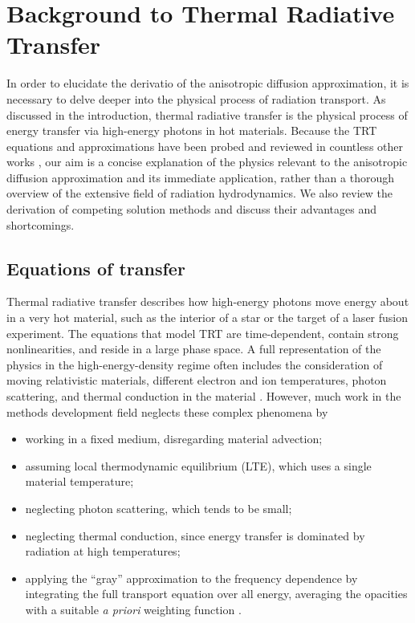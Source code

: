 
\chapter{Background to Thermal Radiative Transfer}\label{chap:trtBackground}

In order to elucidate the derivatio of the anisotropic
diffusion approximation, it is necessary to delve deeper into the physical
process of radiation transport. As discussed in the introduction,
thermal radiative transfer is the physical process of energy transfer via
high-energy photons in hot materials. Because the TRT equations and
approximations have been probed and reviewed in countless other works
\cite{Mih1984,Pom1973,Cas2004,Wol2008}, our aim is a concise explanation of the
physics relevant to the anisotropic diffusion approximation and its immediate
application, rather than a thorough overview of the extensive field of radiation
hydrodynamics. We also review the derivation of competing solution methods and
discuss their advantages and shortcomings.

\section{Equations of transfer}\label{sec:bgTrtEquations}
Thermal radiative transfer describes how high-energy photons move energy about
in a very hot material, such as the interior of a star or the target of a laser
fusion experiment. The equations that model TRT are time-dependent, contain
strong nonlinearities, and reside in a large phase space.
A full representation of the physics in
the high-energy-density regime often includes the consideration of moving
relativistic materials, different electron and ion temperatures, photon
scattering, and thermal conduction in the material \cite{Mih1984}. However,
much work in the methods development field neglects these complex phenomena by
\begin{itemize}
  \item working in a fixed medium, disregarding material advection;
  \item assuming local thermodynamic equilibrium (LTE), which uses a single
    material temperature;
  \item neglecting photon scattering, which tends to be small;
  \item neglecting thermal conduction, since energy transfer is dominated by
    radiation at high temperatures;
  \item applying the ``gray'' approximation to the frequency dependence by
    integrating the full transport equation over all energy, averaging the
    opacities with a suitable \emph{a priori} weighting function \cite{Lar1983a}.
\end{itemize}

